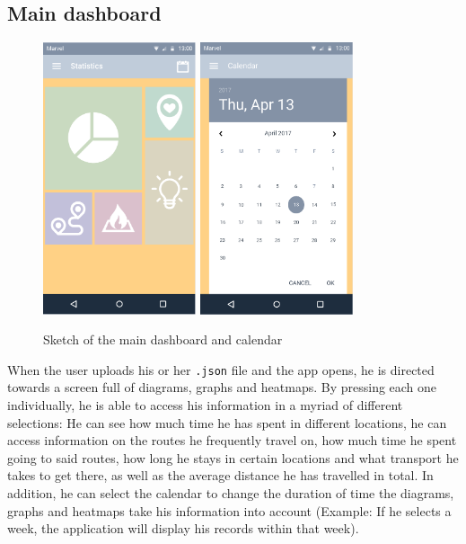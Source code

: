 \documentclass[12p]{article}
\begin{document}
    		\subsection{Main dashboard}
    		\begin{figure}[ht]
    		    \center
                \includegraphics[height=8cm,keepaspectratio]{pics/app_design/main.PNG}
                \includegraphics[height=8cm,keepaspectratio]{pics/app_design/calendar.PNG}
                \caption{Sketch of the main dashboard and calendar}
            \end{figure}
    		When the user uploads his or her \texttt{.json} file and the app opens, he is directed towards a screen full of diagrams, graphs and heatmaps. By pressing each one individually, he is able to access his information in a myriad of different selections: He can see how much time he has spent in different locations, he can access information on the routes he frequently travel on, how much time he spent going to said routes, how long he stays in certain locations and what transport he takes to get there, as well as the average distance he has travelled in total. In addition, he can select the calendar to change the duration of time the diagrams, graphs and heatmaps take his information into account (Example: If he selects a week, the application will display his records within that week).
    		
\end{document}
